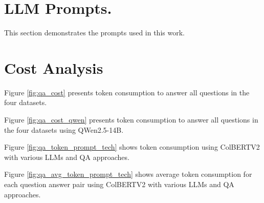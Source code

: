 \cleardoublepage
\chapter{LLM Prompts.}
\label{ch:appendices}

This section demonstrates the prompts used in this work.\\








\chapter{Cost Analysis}

\noindent Figure \ref{fig:qa_cost} presents token consumption to answer all questions in the four datasets.



\noindent Figure \ref{fig:qa_cost_qwen} presents token consumption to answer all questions in the four datasets using QWen2.5-14B.



\noindent Figure \ref{fig:qa_token_prompt_tech} shows token consumption using ColBERTV2 with various LLMs and QA approaches.



\noindent Figure \ref{fig:qa_avg_token_prompt_tech} shows average token consumption for each question answer pair using ColBERTV2 with various LLMs and QA approaches.


